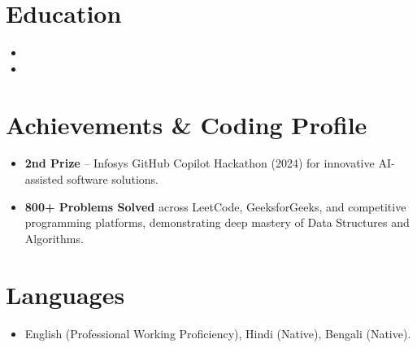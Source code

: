 \documentclass[11pt,a4paper,sans]{moderncv}
\begin{document}

\section{Education}
\vspace{1pt}
\begin{itemize}

\item{}

\vspace{2pt}
\item{}

\end{itemize}


\section{Achievements \& Coding Profile}
\vspace{1pt}
\begin{itemize}
\item{\textbf{2nd Prize} -- Infosys GitHub Copilot Hackathon (2024) for innovative AI-assisted software solutions.}
\item{\textbf{800+ Problems Solved} across LeetCode, GeeksforGeeks, and competitive programming platforms, demonstrating deep mastery of Data Structures and Algorithms.}
\end{itemize}


\section{Languages}
\vspace{1pt}
\begin{itemize}
\item{English (Professional Working Proficiency), Hindi (Native), Bengali (Native).}
\end{itemize}
\end{document}
